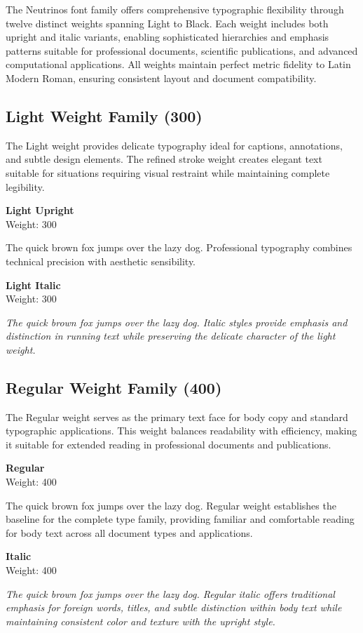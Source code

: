 \documentclass[11pt,letterpaper]{article}
\newcommand{\weightdemo}[3]{%
\noindent
\begin{minipage}{0.25\textwidth}
\textbf{#1}\\
{\small Weight: #2}
\end{minipage}%
\begin{minipage}{0.75\textwidth}
#3
\end{minipage}
\vspace{0.5em}
}
\begin{document}
The Neutrinos font family offers comprehensive typographic flexibility through twelve distinct weights spanning Light to Black. Each weight includes both upright and italic variants, enabling sophisticated hierarchies and emphasis patterns suitable for professional documents, scientific publications, and advanced computational applications. All weights maintain perfect metric fidelity to Latin Modern Roman, ensuring consistent layout and document compatibility.

\subsection{Light Weight Family (300)}

The Light weight provides delicate typography ideal for captions, annotations, and subtle design elements. The refined stroke weight creates elegant text suitable for situations requiring visual restraint while maintaining complete legibility.

\weightdemo{Light Upright}{300}{%
{\lightfont The quick brown fox jumps over the lazy dog. Professional typography combines technical precision with aesthetic sensibility.}
}

\weightdemo{Light Italic}{300}{%
{\lightfont\itshape The quick brown fox jumps over the lazy dog. Italic styles provide emphasis and distinction in running text while preserving the delicate character of the light weight.}
}

\subsection{Regular Weight Family (400)}

The Regular weight serves as the primary text face for body copy and standard typographic applications. This weight balances readability with efficiency, making it suitable for extended reading in professional documents and publications.

\weightdemo{Regular}{400}{%
The quick brown fox jumps over the lazy dog. Regular weight establishes the baseline for the complete type family, providing familiar and comfortable reading for body text across all document types and applications.
}

\weightdemo{Italic}{400}{%
\textit{The quick brown fox jumps over the lazy dog. Regular italic offers traditional emphasis for foreign words, titles, and subtle distinction within body text while maintaining consistent color and texture with the upright style.}
}
\end{document}
